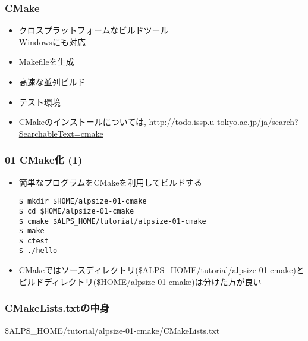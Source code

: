 \begin{frame}
  \frametitle{CMake}
  \begin{itemize}
    \setlength{\itemsep}{1em}
  \item クロスプラットフォームなビルドツール \\
    Windowsにも対応
  \item Makefileを生成
  \item 高速な並列ビルド
  \item テスト環境
  \item CMakeのインストールについては, \url{http://todo.issp.u-tokyo.ac.jp/ja/search?SearchableText=cmake}
  \end{itemize}
\end{frame}

\begin{frame}[c,fragile]
  \frametitle{01 CMake化 (1)}
  \begin{itemize}
    \setlength{\itemsep}{1em}
  \item 簡単なプログラムをCMakeを利用してビルドする
\begin{lstlisting}
$ mkdir $HOME/alpsize-01-cmake
$ cd $HOME/alpsize-01-cmake
$ cmake $ALPS_HOME/tutorial/alpsize-01-cmake
$ make
$ ctest
$ ./hello
\end{lstlisting}
  \item {\color{red} CMakeではソースディレクトリ(\$ALPS\_HOME/tutorial/alpsize-01-cmake)とビルドディレクトリ(\$HOME/alpsize-01-cmake)は分けた方が良い}
  \end{itemize}
\end{frame}

\begin{frame}[fragile,shrink=15]
  \frametitle{CMakeLists.txtの中身}
  \$ALPS\_HOME/tutorial/alpsize-01-cmake/CMakeLists.txt
\end{frame}

